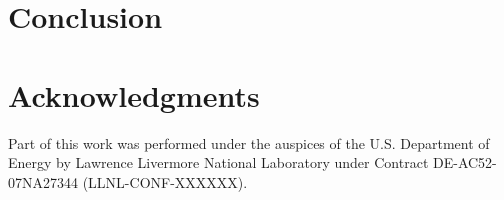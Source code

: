 
\section{Conclusion}

\section{Acknowledgments}
Part of this work was performed under the auspices of the
U.S. Department of Energy by Lawrence Livermore National Laboratory
under Contract DE-AC52-07NA27344 (LLNL-CONF-XXXXXX).



